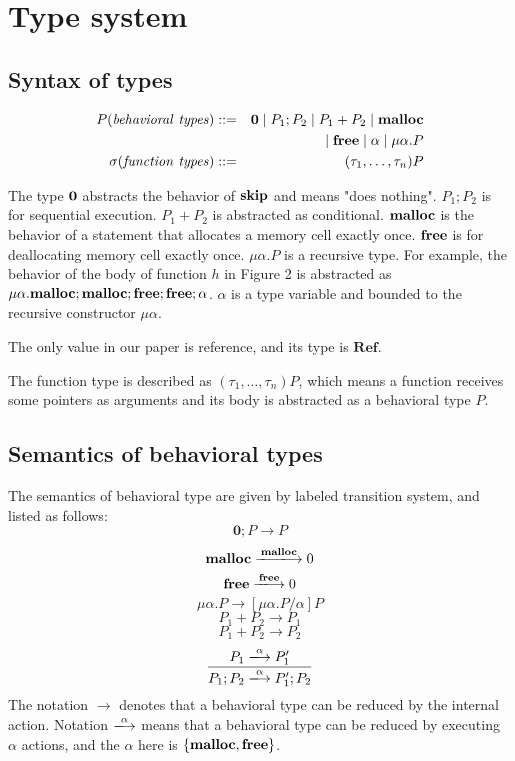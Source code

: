
\section{Type system}
\label{sec:typesystem}

\subsection{Syntax of types}
     \begin{eqnarray*}
       P (\mathit{behavioral\ types})::=&& {\bf 0} \;|\; P_{1};P_{2} \;|\; P_{1}+P_{2} \;|\; \mathbf{malloc}\\
       &&\;|\; \mathbf{free} \;|\; \alpha \;|\; \mu\alpha.P \\
      \sigma (\mathit{function\ types})::=&& (\tau_{1},\dots, \tau_{n}) P
     \end{eqnarray*}

The type $\bf 0$ abstracts the behavior of $\mathbf{skip}$ and means "does nothing". $P_{1};P_{2}$ is for sequential execution. $P_{1} + P_{2}$ is abstracted as conditional. $\mathbf{malloc}$ is the behavior of a statement that allocates a memory cell exactly once. $\mathbf{free}$ is for deallocating memory cell exactly once. $\mu \alpha. P$ is a recursive type. For example, the behavior of  the body of function $h$ in Figure 2 is abstracted as $\mu \alpha. \mathbf{malloc};\mathbf{malloc};\mathbf{free};\mathbf{free};\alpha$. $\alpha$ is a type variable and bounded to the recursive constructor $\mu \alpha$.

The only value in our paper is reference, and its type is $\mathbf{Ref}$.

The function type is described as $(\tau_{1}, \dots, \tau_{n})P$, which means a function receives some pointers as arguments and its body is abstracted as a behavioral type $P$.

\subsection{Semantics of behavioral types}
The semantics of behavioral type are given by labeled transition system, and listed as follows:
    $$
        \mathbf{0};P \rightarrow P
    $$
    $$
          \Malloc \xlongrightarrow{\Malloc} 0
    $$
    $$
           \Free \xlongrightarrow{\Free} 0
    $$
    $$
          \mu \alpha.P \rightarrow  [\mu \alpha . P/\alpha]  P
    $$
   $$
          P_{1} + P_{2} \longrightarrow P_{1}
   $$
   $$
          P_{1} + P_{2} \longrightarrow P_{2}
   $$
   $$
           \frac{P_{1} \xlongrightarrow{\alpha} P_{1}' }
                 {P_{1};P_{2} \xlongrightarrow{\alpha} P_{1}';P_{2}}
   $$
The notation $\rightarrow$ denotes that a behavioral type can be reduced by the internal action. Notation $\xlongrightarrow{\alpha}$ means that a behavioral type can be reduced by executing $\alpha$ actions, and the $\alpha$ here is $\{\mathbf{malloc}, \mathbf{free}\}$.

